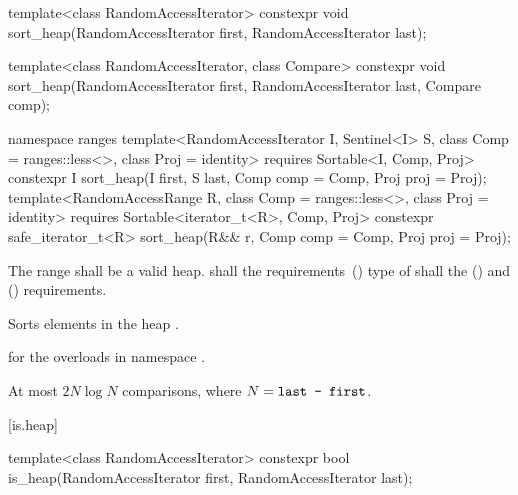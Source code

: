 %
\begin{itemdecl}
template<class RandomAccessIterator>
  constexpr void sort_heap(RandomAccessIterator first, RandomAccessIterator last);

template<class RandomAccessIterator, class Compare>
  constexpr void sort_heap(RandomAccessIterator first, RandomAccessIterator last,
                           Compare comp);
\end{itemdecl}
\begin{addedblock}
\begin{itemdecl}
namespace ranges {
  template<RandomAccessIterator I, Sentinel<I> S, class Comp = ranges::less<>,
      class Proj = identity>
    requires Sortable<I, Comp, Proj>
    constexpr I
      sort_heap(I first, S last, Comp comp = Comp{}, Proj proj = Proj{});
  template<RandomAccessRange R, class Comp = ranges::less<>, class Proj = identity>
    requires Sortable<iterator_t<R>, Comp, Proj>
    constexpr safe_iterator_t<R>
      sort_heap(R&& r, Comp comp = Comp{}, Proj proj = Proj{});
}
\end{itemdecl}
\end{addedblock}

\begin{itemdescr}
\pnum
\requires The range  shall be a valid heap.
 shall  the
 requirements~()  type
of  shall  the
 () and
 () requirements.

\pnum
\effects
Sorts elements in the heap
.

\begin{addedblock}
\pnum
\returns
{} for the overloads in namespace .
\end{addedblock}

\pnum
\complexity
At most $2N \log N$
comparisons, where
$N = \texttt{last - first}$.
\end{itemdescr}


[is.heap]{}

%
\begin{itemdecl}
template<class RandomAccessIterator>
  constexpr bool is_heap(RandomAccessIterator first, RandomAccessIterator last);
\end{itemdecl}

